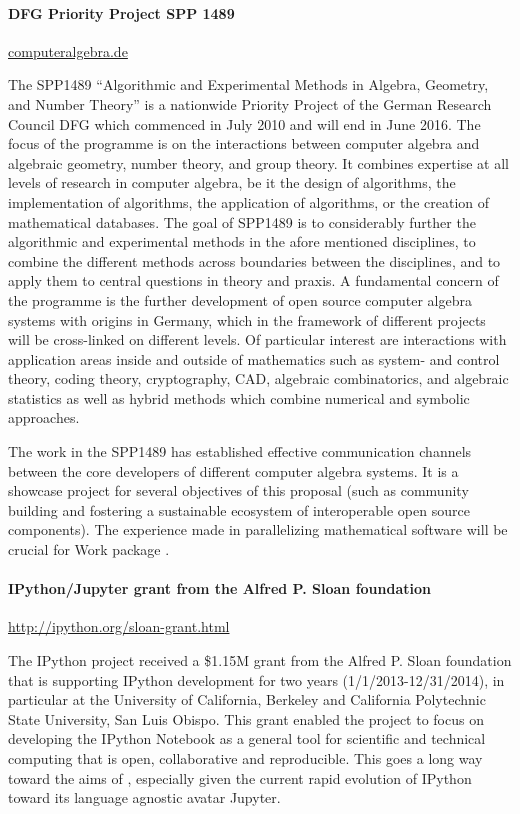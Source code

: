 
\paragraph{DFG Priority Project SPP 1489}
\url{computeralgebra.de}

The SPP1489 ``Algorithmic and Experimental Methods in Algebra, Geometry, and
Number Theory'' is a nationwide Priority Project of the German Research Council DFG
which commenced in July  2010 and will end in June 2016. The focus of the programme
is on the interactions between computer algebra and algebraic geometry, number theory,
and group theory. It combines expertise at all levels of research in computer algebra,
be it the design of algorithms, the implementation of algorithms, the application
of algorithms, or the creation of mathematical databases. The goal of SPP1489 is to
considerably further the algorithmic and experimental methods in the afore mentioned
disciplines, to combine the different methods across boundaries between the disciplines,
and to apply them to central questions in theory and praxis. A fundamental concern of the
programme is the further development of open source
computer algebra systems with origins in Germany, which in
the framework of different projects will be cross-linked on
different levels. Of particular interest are interactions with application areas inside
and outside of mathematics such as system- and control theory, coding
theory, cryptography, CAD, algebraic combinatorics, and algebraic
statistics as well as hybrid methods which combine numerical and
symbolic approaches.

The work in the SPP1489 has established effective communication channels between the core
developers of different computer algebra systems. It is a showcase project for several
objectives of this proposal (such as community building and fostering a sustainable
ecosystem of interoperable open source components).  The experience made in parallelizing
mathematical software will be crucial for Work package .


\paragraph{IPython/Jupyter grant from the Alfred P. Sloan foundation}
\url{http://ipython.org/sloan-grant.html}

The IPython project received a \$1.15M grant from the Alfred P. Sloan
foundation that is supporting IPython development for two years
(1/1/2013-12/31/2014), in particular at the University of California,
Berkeley and California Polytechnic State University, San Luis Obispo.
This grant enabled the project to focus on developing the IPython
Notebook as a general tool for scientific and technical computing that
is open, collaborative and reproducible. This goes a long way toward
the aims  of \TheProject, especially given the current
rapid evolution of IPython toward its language agnostic avatar
Jupyter.

